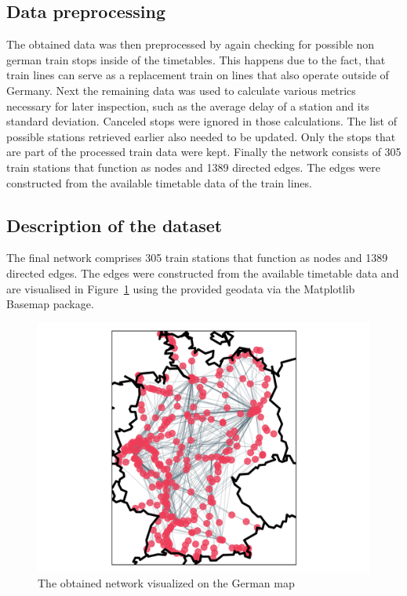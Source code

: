 \documentclass[12pt,a4paper]{article}
\begin{document}
\subsection{\label{sec:Preprocessing}Data preprocessing}

The obtained data was then preprocessed by again checking for possible non german train stops inside of the timetables. This happens due to the fact, that train lines can serve as a replacement train on lines that also operate outside of Germany. Next the remaining data was used to calculate various metrics necessary for later inspection, such as the average delay of a station and its standard deviation. Canceled stops were ignored in those calculations. 
The list of possible stations retrieved earlier also needed to be updated. Only the stops that are part of the processed train data were kept. Finally the network consists of 305 train stations that function as nodes and 1389 directed edges. The edges were constructed from the available timetable data of the train lines.

\maketitle
\subsection{\label{sec:Preprocessing}Description of the dataset}

The final network comprises 305 train stations that function as nodes and 1389 directed edges. The edges were constructed from the available timetable data and are visualised in Figure~\ref{fig:network-map} using the provided geodata via the Matplotlib Basemap package.

\begin{figure}[h]
  \includegraphics[clip=true,width=\columnwidth]{../data/visualizations/network.png}
  \caption{The obtained network visualized on the German map}
   \label{fig:network-map}
\end{figure}
\end{document}
